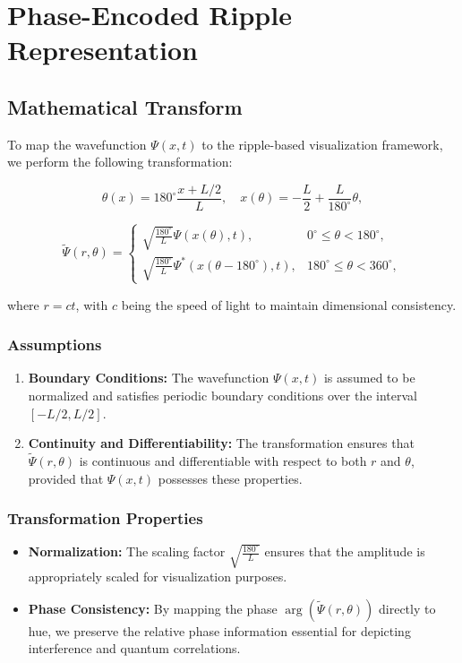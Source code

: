\documentclass[12pt]{article}
\begin{document}
\section{Phase-Encoded Ripple Representation}
\label{sec:phase_encoded_ripple}

\subsection{Mathematical Transform}
To map the wavefunction \(\Psi(x,t)\) to the ripple-based visualization framework, we perform the following transformation:

\[
\theta(x) = 180^\circ \frac{x + L/2}{L}, \quad x(\theta) = -\frac{L}{2} + \frac{L}{180^\circ}\theta,
\]

\[
\tilde{\Psi}(r, \theta) = 
\begin{cases}
\sqrt{\frac{180^\circ}{L}} \Psi(x(\theta), t), & 0^\circ \leq \theta < 180^\circ, \\
\sqrt{\frac{180^\circ}{L}} \Psi^*(x(\theta - 180^\circ), t), & 180^\circ \leq \theta < 360^\circ,
\end{cases}
\]

where \(r = ct\), with \(c\) being the speed of light to maintain dimensional consistency.

\subsubsection{Assumptions}
\begin{enumerate}
    \item \textbf{Boundary Conditions:} The wavefunction \(\Psi(x,t)\) is assumed to be normalized and satisfies periodic boundary conditions over the interval \([-L/2, L/2]\).
    \item \textbf{Continuity and Differentiability:} The transformation ensures that \(\tilde{\Psi}(r, \theta)\) is continuous and differentiable with respect to both \(r\) and \(\theta\), provided that \(\Psi(x,t)\) possesses these properties.
\end{enumerate}

\subsubsection{Transformation Properties}
\begin{itemize}
    \item \textbf{Normalization:} The scaling factor \(\sqrt{\frac{180^\circ}{L}}\) ensures that the amplitude is appropriately scaled for visualization purposes.
    \item \textbf{Phase Consistency:} By mapping the phase \(\arg(\tilde{\Psi}(r, \theta))\) directly to hue, we preserve the relative phase information essential for depicting interference and quantum correlations.
\end{itemize}
\end{document}
